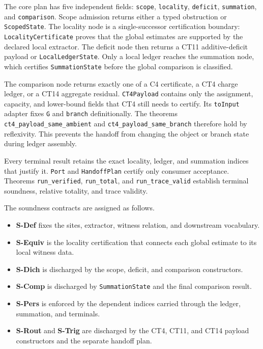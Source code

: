\documentclass[
  11pt,
]{article}
\providecommand{\tightlist}{%
  \setlength{\itemsep}{0pt}\setlength{\parskip}{0pt}}
\theoremstyle{definition}
\begin{document}
The core plan has five independent fields:
\texttt{scope}, \texttt{locality}, \texttt{deficit},
\texttt{summation}, and \texttt{comparison}.  Scope admission returns either a
typed obstruction or \texttt{ScopedState}.  The locality node is a
single-successor certification boundary: \texttt{LocalityCertificate} proves
that the global estimates are supported by the declared local extractor.
The deficit node then returns a CT11 additive-deficit payload or
\texttt{LocalLedgerState}.  Only a local ledger reaches the summation node,
which certifies \texttt{SummationState} before the global comparison is
classified.

The comparison node returns exactly one of a C4 certificate, a CT4 charge
ledger, or a CT14 aggregate residual.  \texttt{CT4Payload} contains only the
assignment, capacity, and lower-bound fields that CT4 still needs to certify.
Its \texttt{toInput} adapter fixes \texttt{G} and \texttt{branch}
definitionally.  The theorems \texttt{ct4\_payload\_same\_ambient} and
\texttt{ct4\_payload\_same\_branch} therefore hold by reflexivity.  This
prevents the handoff from changing the object or branch state during ledger
assembly.

Every terminal result retains the exact locality, ledger, and summation
indices that justify it.  \texttt{Port} and \texttt{HandoffPlan} certify only
consumer acceptance.  Theorems \texttt{run\_verified}, \texttt{run\_total},
and \texttt{run\_trace\_valid} establish terminal soundness, relative
totality, and trace validity.

The soundness contracts are assigned as follows.
\begin{itemize}
\tightlist
\item \textbf{S-Def} fixes the sites, extractor, witness relation, and downstream vocabulary.
\item \textbf{S-Equiv} is the locality certification that connects each global estimate to its local witness data.
\item \textbf{S-Dich} is discharged by the scope, deficit, and comparison constructors.
\item \textbf{S-Comp} is discharged by \texttt{SummationState} and the final comparison result.
\item \textbf{S-Pers} is enforced by the dependent indices carried through the ledger, summation, and terminals.
\item \textbf{S-Rout} and \textbf{S-Trig} are discharged by the CT4, CT11, and CT14 payload constructors and the separate handoff plan.
\end{itemize}
\end{document}
